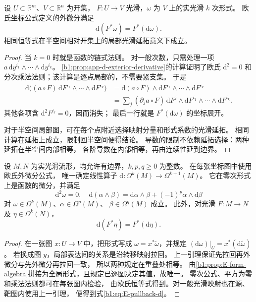 \begin{lemma}[欧氏拉回与外微分]\label{b1:lem:E-euclidean-pullback-d}
设 \(U\subset\mathbb R^m\)、\(V\subset\mathbb R^n\) 为开集，
\(F:U\to V\) 光滑，\(\omega\) 为 \(V\) 上的实光滑 \(k\) 次形式。
欧氏坐标公式定义的外微分满足
\[
 \mathrm d(F^*\omega)=F^*(\mathrm d\omega).
\]
相同恒等式在半空间相对开集上的局部光滑延拓意义下成立。
\end{lemma}
\begin{proof}
当 \(k=0\) 时就是函数的链式法则。
对一般次数，只需处理一项 \(a\,\mathrm dy^{i_1}\wedge\cdots\wedge\mathrm dy^{i_k}\)。
\cref{b1:prop:app-d-exterior-derivative}的计算证明了欧氏
\(\mathrm d^2=0\) 和分次乘法法则；该计算是逐点局部的，不需要紧支集。
于是
\[
 \begin{aligned}
 \mathrm d\bigl((a\circ F)\,
          \mathrm dF^{i_1}\wedge\cdots\wedge\mathrm dF^{i_k}\bigr)
 &=\mathrm d(a\circ F)\wedge
          \mathrm dF^{i_1}\wedge\cdots\wedge\mathrm dF^{i_k}\\
 &=\sum_j(\partial_j a\circ F)\,
       \mathrm dF^j\wedge
          \mathrm dF^{i_1}\wedge\cdots\wedge\mathrm dF^{i_k}.
 \end{aligned}
\]
其他各项含 \(\mathrm d^2F^{i_\ell}=0\)，因而消失；
最后一行就是 \(F^*(\mathrm d\omega)\) 的坐标展开。

对于半空间局部图，可在每个点附近选择映射分量和形式系数的光滑延拓。
相同计算在延拓上成立，限制回半空间便得结论。
导数的限制不依赖延拓选择：两种延拓在半空间内部相等，
各阶导数在内部相等，再由连续性延到边界。
\end{proof}

\begin{proposition}[全局外微分及自然性]\label{b1:prop:E-pullback-d}
设 \(M,N\) 为实光滑流形，均允许有边界，\(k,p,q\geq0\) 为整数。
在每张坐标图中使用欧氏外微分公式，
唯一确定线性算子
\(\mathrm d:\Omega^k(M)\to\Omega^{k+1}(M)\)。
它在零次形式上是函数的微分，并满足
\[
 \mathrm d^2\omega=0,\quad
 \mathrm d(\alpha\wedge\beta)
 =\mathrm d\alpha\wedge\beta+(-1)^p\alpha\wedge\mathrm d\beta
\]
对 \(\omega\in\Omega^k(M)\)、\(\alpha\in\Omega^p(M)\)、
\(\beta\in\Omega^q(M)\) 成立。
此外，对光滑 \(F:M\to N\) 及 \(\eta\in\Omega^k(N)\)，
\begin{equation}
 \mathrm d(F^*\eta)=F^*(\mathrm d\eta).
 \label{b1:eq:E-pullback-d}
\end{equation}
\end{proposition}
\begin{proof}
在一张图 \(x:U\to V\) 中，把形式写成
\(\omega=x^*\widetilde\omega\)，并规定
\((\mathrm d\omega)|_U=x^*(\mathrm d\widetilde\omega)\)。
若换成图 \(y\)，局部表达间的关系是沿转移映射拉回。
上一引理保证先拉回再外微分与先外微分再拉回一致，
所以两种规定在重叠处相等。
由\cref{b1:prop:E-form-algebra}拼接为全局形式，且规定已逐图决定其值，故唯一。
零次公式、平方为零和乘法法则都可在每张图内检验，
由欧氏恒等式得到。对一般光滑映射也在源、靶图内使用上一引理，
便得到式\eqref{b1:eq:E-pullback-d}。
\end{proof}

